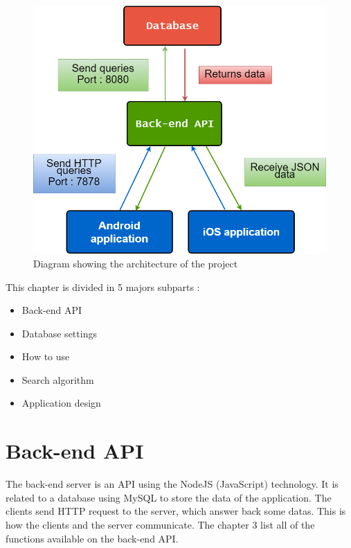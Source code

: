 \begin{figure}[h]
\centering
\includegraphics[scale=0.40]{diagrams/connecting_parts.png}
\caption{Diagram showing the architecture of the project}
\end{figure}

This chapter is divided in 5 majors subparts :
\begin{itemize}
    \item Back-end API
    \item Database settings
    \item How to use
    \item Search algorithm
    \item Application design
\end{itemize}

\section{Back-end API}
The back-end server is an API using the NodeJS (JavaScript) technology. It is related to a database using MySQL to store the data of the application. The clients send HTTP request to the server, which answer back some datas. This is how the clients and the server communicate. The chapter 3 list all of the functions available on the back-end API.

